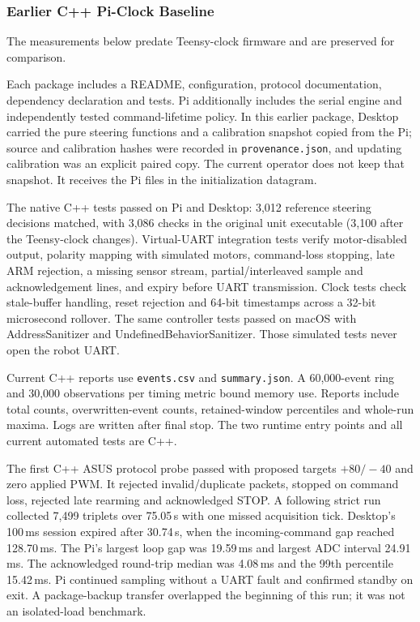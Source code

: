 \subsubsection{Earlier C++ Pi-Clock Baseline}
The measurements below predate Teensy-clock firmware and are preserved for comparison.

Each package includes a README, configuration, protocol documentation, dependency declaration and tests. Pi additionally includes the serial engine and independently tested command-lifetime policy. In this earlier package, Desktop carried the pure steering functions and a calibration snapshot copied from the Pi; source and calibration hashes were recorded in \texttt{provenance.json}, and updating calibration was an explicit paired copy. The current operator does not keep that snapshot. It receives the Pi files in the initialization datagram.

The native C++ tests passed on Pi and Desktop: 3,012 reference steering decisions matched, with 3,086 checks in the original unit executable (3,100 after the Teensy-clock changes). Virtual-UART integration tests verify motor-disabled output, polarity mapping with simulated motors, command-loss stopping, late ARM rejection, a missing sensor stream, partial/interleaved sample and acknowledgement lines, and expiry before UART transmission. Clock tests check stale-buffer handling, reset rejection and 64-bit timestamps across a 32-bit microsecond rollover. The same controller tests passed on macOS with AddressSanitizer and UndefinedBehaviorSanitizer. Those simulated tests never open the robot UART.

Current C++ reports use \texttt{events.csv} and \texttt{summary.json}. A 60,000-event ring and 30,000 observations per timing metric bound memory use. Reports include total counts, overwritten-event counts, retained-window percentiles and whole-run maxima. Logs are written after final stop. The two runtime entry points and all current automated tests are C++.

The first C++ ASUS protocol probe passed with proposed targets $+80/-40$ and zero applied PWM. It rejected invalid/duplicate packets, stopped on command loss, rejected late rearming and acknowledged STOP. A following strict run collected 7,499 triplets over 75.05\,s with one missed acquisition tick. Desktop's 100\,ms session expired after 30.74\,s, when the incoming-command gap reached 128.70\,ms. The Pi's largest loop gap was 19.59\,ms and largest ADC interval 24.91\,ms. The acknowledged round-trip median was 4.08\,ms and the 99th percentile 15.42\,ms. Pi continued sampling without a UART fault and confirmed standby on exit. A package-backup transfer overlapped the beginning of this run; it was not an isolated-load benchmark.

